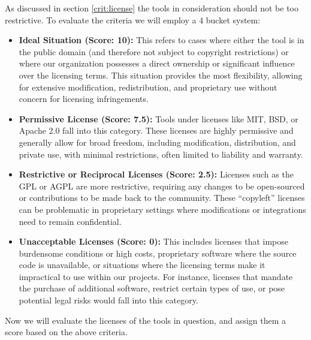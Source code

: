 As discussed in section \ref{crit:license} the tools in consideration should not be too restrictive.
To evaluate the criteria we will employ a 4 bucket system: 
\begin{itemize}
    \item \textbf{Ideal Situation (Score: 10):} 
    This refers to cases where either the tool is in the public domain (and therefore not subject to copyright restrictions) or where our organization possesses a direct ownership or significant influence over the licensing terms.
    This situation provides the most flexibility, allowing for extensive modification, redistribution, and proprietary use without concern for licensing infringements.


    \item \textbf{Permissive License (Score: 7.5):}
    Tools under licenses like MIT, BSD, or Apache 2.0 fall into this category.
    These licenses are highly permissive and generally allow for broad freedom, including modification, distribution, and private use, with minimal restrictions, often limited to liability and warranty.

    \item \textbf{Restrictive or Reciprocal Licenses (Score: 2.5):}
    Licenses such as the GPL or AGPL are more restrictive, requiring any changes to be open-sourced or contributions to be made back to the community.
    These “copyleft” licenses can be problematic in proprietary settings where modifications or integrations need to remain confidential.

    \item \textbf{Unacceptable Licenses (Score: 0):}
    This includes licenses that impose burdensome conditions or high costs, proprietary software where the source code is unavailable, or situations where the licensing terms make it impractical to use within our projects.
    For instance, licenses that mandate the purchase of additional software, restrict certain types of use, or pose potential legal risks would fall into this category.
\end{itemize}

Now we will evaluate the licenses of the tools in question, and assign them a score based on the above criteria.

